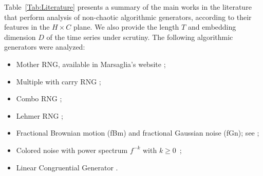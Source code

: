 \documentclass[alpha-refs]{wiley-article}
\begin{document}
Table~\ref{Tab:Literature} presents a summary of the main works in the literature that perform analysis of non-chaotic algorithmic generators, according to their features in the $H\times C$ plane.
We also provide the length $T$ and embedding dimension $D$ of the time series under scrutiny.
The following algorithmic generators were analyzed:
\begin{itemize}
\item Mother RNG, available in Marsaglia's website \citep[MOT,][]{marsaglia1994yet};
\item Multiple with carry RNG \citep[MWC,][]{marsaglia1994yet};
\item Combo RNG \citep[COM,][]{marsaglia1994yet};
\item Lehmer RNG \citep[LEH,][]{payne1969coding};
\item Fractional Brownian motion (fBm) and fractional Gaussian noise (fGn); see \citet{bardet2003generators};
\item Colored noise with power spectrum $f^{-k}$ with $k \geq 0$~\citep{larrondo2012matlab};
\item Linear Congruential Generator \citep[LCG,][]{knuth1997sorting}.
\end{itemize}
\end{document}
